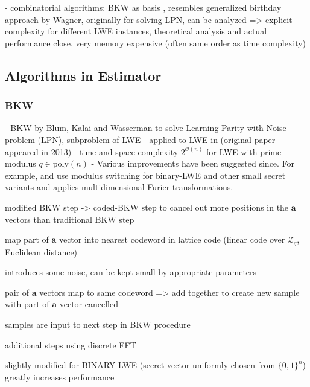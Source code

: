 - combinatorial algorithms: BKW as basis \cite{BKW03}, resembles generalized birthday approach by Wagner, %
originally for solving LPN, can be analyzed => explicit complexity for different LWE instances, theoretical analysis and actual performance close,
very memory expensive (often same order as time complexity) 

\subsection{Algorithms in Estimator}
\subsubsection{BKW \cite{BKW03}}

- BKW by Blum, Kalai and Wasserman \cite{BKW03} to solve Learning Parity with Noise problem (LPN), subproblem of LWE
- applied to LWE in \cite{ACFFP15a} (original paper appeared in 2013)
- time and space complexity $2^{\mathcal{O}(n)}$ for LWE with prime modulus $q \in \text{poly}(n)$ %
- Various improvements have been suggested since. For example, \cite{AFFP14} and \cite{KF15} use modulus switching for binary-LWE and other small secret variants \cite{AFFP14} and \cite{DTV15} applies multidimensional Furier transformations. %

modified BKW step -> coded-BKW step to cancel out more positions in the $\textbf{a}$ vectors than traditional BKW step

map part of $\textbf{a}$ vector into nearest codeword in lattice code (linear code over $\mathcal{Z}_q$, Euclidean distance)

introduces some noise, can be kept small by appropriate parameters

pair of $\textbf{a}$ vectors map to same codeword => add together to create new sample with part of $\textbf{a}$ vector cancelled

samples are input to next step in BKW procedure

additional steps using discrete FFT

slightly modified for BINARY-LWE (secret vector uniformly chosen from $\{0, 1\}^n$) greatly increases performance

